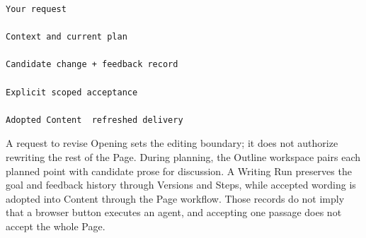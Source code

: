 \begin{verbatim}
Your request

Context and current plan

Candidate change + feedback record

Explicit scoped acceptance

Adopted Content  refreshed delivery
\end{verbatim}
A request to revise Opening sets the editing boundary; it does not authorize rewriting the rest of the Page. During planning, the Outline workspace pairs each planned point with candidate prose for discussion. A Writing Run preserves the goal and feedback history through Versions and Steps, while accepted wording is adopted into Content through the Page workflow. Those records do not imply that a browser button executes an agent, and accepting one passage does not accept the whole Page.

